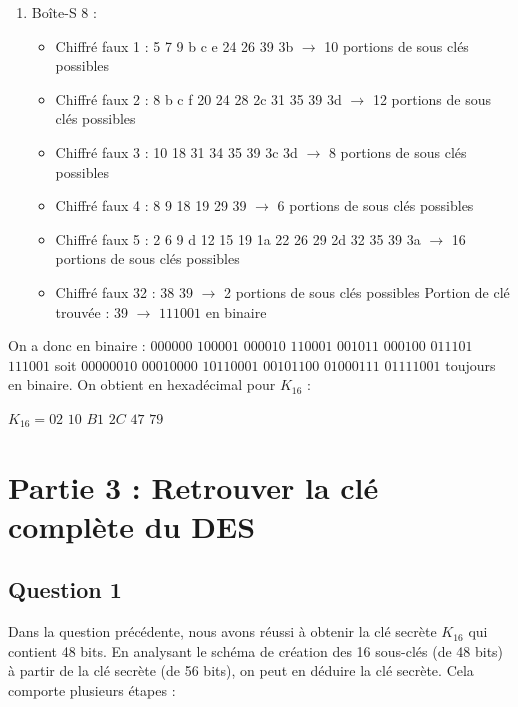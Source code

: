\documentclass[11pt]{article}
\begin{document}
\begin{enumerate}
\item Boîte-S 8 : 
\begin{itemize}
	\item Chiffré faux 1 : 5 7 9 b c e 24 26 39 3b $\longrightarrow$ 10 portions de sous clés possibles
	\item Chiffré faux 2 : 8 b c f 20 24 28 2c 31 35 39 3d $\longrightarrow$ 12 portions de sous clés possibles
	\item Chiffré faux 3 : 10 18 31 34 35 39 3c 3d $\longrightarrow$ 8 portions de sous clés possibles
	\item Chiffré faux 4 : 8 9 18 19 29 39 $\longrightarrow$ 6 portions de sous clés possibles
	\item Chiffré faux 5 : 2 6 9 d 12 15 19 1a 22 26 29 2d 32 35 39 3a $\longrightarrow$ 16 portions de sous clés possibles
	\item Chiffré faux 32 : 38 39 $\longrightarrow$ 2 portions de sous clés possibles \newline
	Portion de clé trouvée : 39 $\longrightarrow$ $111001$ en binaire
\end{itemize}

\end{enumerate}

On a donc en binaire : $000000$ $100001$ $000010$ $110001$ $001011$ $000100$ $011101$ $111001$ \newline 
soit $00000010$ $00010000$ $10110001$ $00101100$ $01000111$ $01111001$ toujours en binaire. \newline
On obtient en hexadécimal pour $K_{16}$ :

\color{red}
$K_{16}=02$ $10$ $B1$ $2C$ $47$ $79$
\color{black}

\section{Partie 3 : Retrouver la clé complète du DES}

\subsection{Question 1}

Dans la question précédente, nous avons réussi à obtenir la clé secrète $K_{16}$ qui contient 48 bits. En analysant le schéma de création des 16 sous-clés (de 48 bits) à partir de la clé secrète (de 56 bits), on peut en déduire la clé secrète. Cela comporte plusieurs étapes : 
\end{document}
